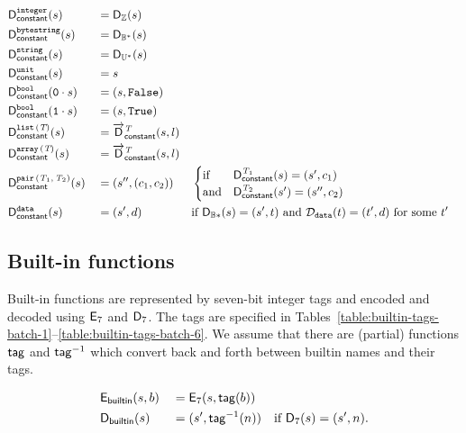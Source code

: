 \begin{alignat*}{3}
  &\mathsf{D}_{\mathsf{constant}}^{\mathtt{integer}}(s)              &&= \mathsf{D}_{\mathbb{Z}}(s) \\
  &\mathsf{D}_{\mathsf{constant}}^{\mathtt{bytestring}}(s)           &&= \mathsf{D}_{\mathbb{B}^*}(s) \\
  &\mathsf{D}_{\mathsf{constant}}^{\mathtt{string}}(s)               &&= \mathsf{D}_{\mathbb{U}^*}(s) \\
  &\mathsf{D}_{\mathsf{constant}}^{\mathtt{unit}}(s)                 &&= s  \\
  &\mathsf{D}_{\mathsf{constant}}^{\mathtt{bool}}(\mathtt{0} \cdot s)  &&= (s, \texttt{False}) \\
  &\mathsf{D}_{\mathsf{constant}}^{\mathtt{bool}}(\mathtt{1} \cdot s)  &&= (s, \texttt{True}) \\
  &\mathsf{D}_{\mathsf{constant}}^{\mathtt{list}\,\mathtt{(}\textit{T}\mathtt{)}}(s)              &&= \overrightarrow{\mathsf{D}}^{\textit{T}}_{\mathsf{constant}}(s, l) \\
  &\mathsf{D}_{\mathsf{constant}}^{\mathtt{array}\,\mathtt{(}\textit{T}\mathtt{)}}(s)             &&= \overrightarrow{\mathsf{D}}^{\textit{T}}_{\mathsf{constant}}(s, l) \\
  &\mathsf{D}_{\mathsf{constant}}^{\mathtt{pair}\,\mathtt{(}\textit{T}_1\mathtt{,}\,\textit{T}_2\mathtt{)}}(s)     &&= (s'', (c_1, c_2))
  && \begin{cases}
       \text{if}  & \mathsf{D}_{\mathsf{constant}}^{\textit{T}_1}(s) = (s', c_1) \\
       \text{and} & \mathsf{D}_{\mathsf{constant}}^{\textit{T}_2}(s') = (s'', c_2)
     \end{cases}\\
  &\mathsf{D}_{\mathsf{constant}}^{\mathtt{data}}(s)                  &&= (s', d) &&
                                           \text{if $\mathsf{D}_{\mathbb{B}*}(s) = (s', t)$
                                            and $\mathcal{D}_{\mathtt{data}}(t) = (t', d)$ for some $t'$}
\end{alignat*}

\subsection{Built-in functions}
Built-in functions are represented by seven-bit integer tags and encoded and
decoded using $\mathsf{E}_7$ and $\mathsf{D}_7$.  The tags are specified in
Tables~\ref{table:builtin-tags-batch-1}--\ref{table:builtin-tags-batch-6}.  We
assume that there are (partial) functions $\mathsf{tag}$ and $\mathsf{tag}^{-1}$ which convert back
and forth between builtin names and their tags.

\begin{alignat*}{2}
  & \mathsf{E}_{\mathsf{builtin}}(s,b) &&= \mathsf{E}_7(s, \mathsf{tag}(b))\\
  & \mathsf{D}_{\mathsf{builtin}}(s)   &&= (s', \mathsf{tag}^{-1}(n)) \quad \text{if $\mathsf{D}_7(s) = (s', n)$}.\\
\end{alignat*}

